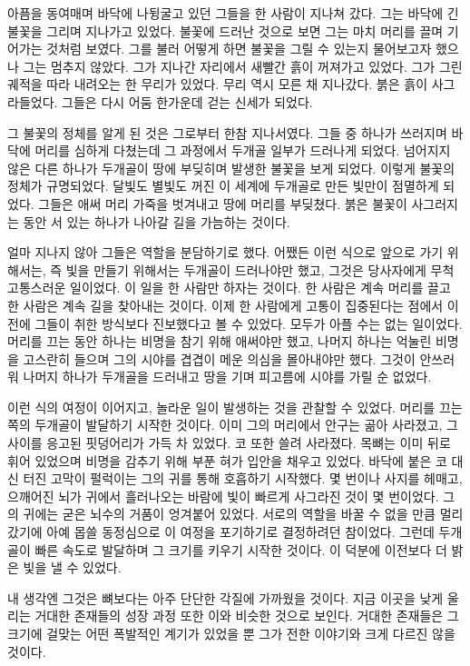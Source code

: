 \documentclass[12pt, b6paper, openany]{memoir}
\newenvironment{article}{}{}
\begin{document}
\begin{article}
아픔을 동여매며 바닥에 나뒹굴고 있던 그들을 한 사람이 지나쳐 갔다. 그는 바닥에 긴 불꽃을 그리며 지나가고 있었다. 불꽃에 드러난 것으로 보면 그는 마치 머리를 끌며 기어가는 것처럼 보였다. 그를 불러 어떻게 하면 불꽃을 그릴 수 있는지 물어보고자 했으나 그는 멈추지 않았다. 그가 지나간 자리에서 새빨간 흙이 꺼져가고 있었다. 그가 그린 궤적을 따라 내려오는 한 무리가 있었다. 무리 역시 모른 채 지나갔다. 붉은 흙이 사그라들었다. 그들은 다시 어둠 한가운데 걷는 신세가 되었다.

그 불꽃의 정체를 알게 된 것은 그로부터 한참 지나서였다. 그들 중 하나가 쓰러지며 바닥에 머리를 심하게 다쳤는데 그 과정에서 두개골 일부가 드러나게 되었다. 넘어지지 않은 다른 하나가 두개골이 땅에 부딪히며 발생한 불꽃을 보게 되었다. 이렇게 불꽃의 정체가 규명되었다. 달빛도 별빛도 꺼진 이 세계에 두개골로 만든 빛만이 점멸하게 되었다. 그들은 애써 머리 가죽을 벗겨내고 땅에 머리를 부딪쳤다. 붉은 불꽃이 사그러지는 동안 서 있는 하나가 나아갈 길을 가늠하는 것이다.

얼마 지나지 않아 그들은 역할을 분담하기로 했다. 어쨌든 이런 식으로 앞으로 가기 위해서는, 즉 빛을 만들기 위해서는 두개골이 드러나야만 했고, 그것은 당사자에게 무척 고통스러운 일이었다. 이 일을 한 사람만 하자는 것이다. 한 사람은 계속 머리를 끌고 한 사람은 계속 길을 찾아내는 것이다. 이제 한 사람에게 고통이 집중된다는 점에서 이전에 그들이 취한 방식보다 진보했다고 볼 수 있었다. 모두가 아플 수는 없는 일이었다. 머리를 끄는 동안 하나는 비명을 참기 위해 애써야만 했고, 나머지 하나는 억눌린 비명을 고스란히 들으며 그의 시야를 겹겹이 메운 의심을 몰아내야만 했다. 그것이 안쓰러워 나머지 하나가 두개골을 드러내고 땅을 기며 피고름에 시야를 가릴 순 없었다.

이런 식의 여정이 이어지고, 놀라운 일이 발생하는 것을 관찰할 수 있었다. 머리를 끄는 쪽의 두개골이 발달하기 시작한 것이다. 이미 그의 머리에서 안구는 곪아 사라졌고, 그 사이를 응고된 핏덩어리가 가득 차 있었다. 코 또한 쓸려 사라졌다. 목뼈는 이미 뒤로 휘어 있었으며 비명을 감추기 위해 부푼 혀가 입안을 채우고 있었다. 바닥에 붙은 코 대신 터진 고막이 펄럭이는 그의 귀를 통해 호흡하기 시작했다. 몇 번이나 사지를 헤매고, 으깨어진 뇌가 귀에서 흘러나오는 바람에 빛이 빠르게 사그라진 것이 몇 번이었다. 그의 귀에는 굳은 뇌수의 거품이 엉겨붙어 있었다. 서로의 역할을 바꿀 수 없을 만큼 멀리 갔기에 아예 몹쓸 동정심으로 이 여정을 포기하기로 결정하려던 참이었다. 그런데 두개골이 빠른 속도로 발달하며 그 크기를 키우기 시작한 것이다. 이 덕분에 이전보다 더 밝은 빛을 낼 수 있었다.

내 생각엔 그것은 뼈보다는 아주 단단한 각질에 가까웠을 것이다. 지금 이곳을 낮게 울리는 거대한 존재들의 성장 과정 또한 이와 비슷한 것으로 보인다. 거대한 존재들은 그 크기에 걸맞는 어떤 폭발적인 계기가 있었을 뿐 그가 전한 이야기와 크게 다르진 않을 것이다.


\end{article}
\end{document}

